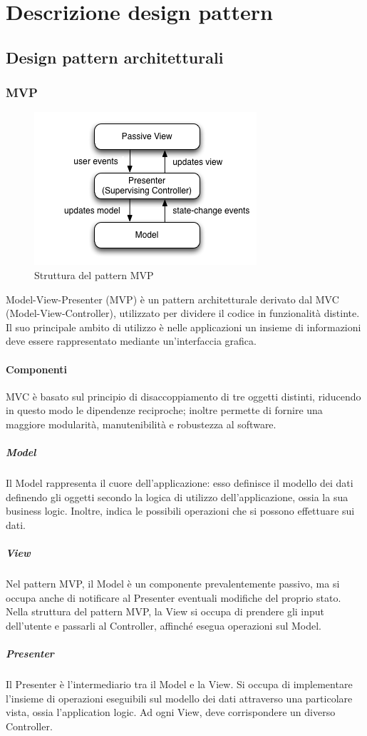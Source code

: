 \documentclass[../SpecificaTecnica.tex]{subfiles}
\begin{document}
\section{Descrizione design pattern}
	\subsection{Design pattern architetturali}
		\subsubsection{MVP}
		
		\begin{figure}[!h]
		\centering
		\includegraphics[scale=0.6]{pattern/mvp}
			\caption{Struttura del pattern MVP}
		\label{fig:Struttura_MVP}
	\end{figure}
	
			Model-View-Presenter (MVP) è un pattern architetturale derivato dal MVC (Model-View-Controller), utilizzato per dividere il codice in funzionalità distinte. Il suo principale ambito di utilizzo è nelle applicazioni un insieme di informazioni deve essere rappresentato mediante un'interfaccia grafica.
			\paragraph{Componenti}
			MVC è basato sul principio di disaccoppiamento di tre oggetti distinti, riducendo in questo modo le dipendenze reciproche; inoltre permette di fornire una maggiore modularità, manutenibilità e robustezza al software.
				\subparagraph{Model}
					Il Model rappresenta il cuore dell'applicazione: esso definisce il modello dei dati definendo gli oggetti secondo la logica di utilizzo dell'applicazione, ossia la sua business logic. Inoltre, indica le possibili operazioni che si possono effettuare sui dati.
				\subparagraph{View}
					Nel pattern MVP, il Model è un componente prevalentemente passivo, ma si occupa anche di notificare al Presenter eventuali modifiche del proprio stato. Nella struttura del pattern MVP, la View si occupa di prendere gli input dell'utente e passarli al Controller, affinché esegua operazioni sul Model.
				\subparagraph{Presenter}
					Il Presenter è l'intermediario tra il Model e la View. Si occupa di implementare l'insieme di operazioni eseguibili sul modello dei dati attraverso una particolare vista, ossia l'application logic. Ad ogni View, deve corrispondere un diverso Controller.
\end{document}
